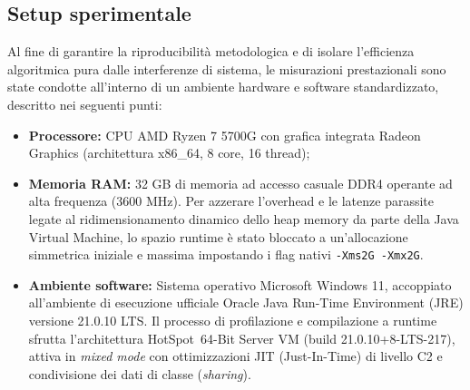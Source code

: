 \documentclass[12pt, a4paper]{article}
\begin{document}
	\subsection{Setup sperimentale}
	Al fine di garantire la riproducibilità metodologica e di isolare l'efficienza algoritmica pura dalle interferenze di sistema, le misurazioni prestazionali sono state condotte all'interno di un ambiente hardware e software standardizzato, descritto nei seguenti punti:
	\begin{itemize}
		\item \textbf{Processore:} CPU AMD Ryzen 7 5700G con grafica integrata Radeon Graphics (architettura x86\_64, 8 core, 16 thread);
		\item \textbf{Memoria RAM:} 32 GB di memoria ad accesso casuale DDR4 operante ad alta frequenza (3600 MHz). Per azzerare l'overhead e le latenze parassite legate al ridimensionamento dinamico dello heap memory da parte della Java Virtual Machine, lo spazio runtime è stato bloccato a un'allocazione simmetrica iniziale e massima impostando i flag nativi \texttt{-Xms2G -Xmx2G}.
		\item \textbf{Ambiente software:} Sistema operativo Microsoft Windows 11, accoppiato all'ambiente di esecuzione ufficiale Oracle Java Run-Time Environment (JRE) versione 21.0.10 LTS. Il processo di profilazione e compilazione a runtime sfrutta l'architettura HotSpot\texttrademark\ 64-Bit Server VM (build 21.0.10+8-LTS-217), attiva in \textit{mixed mode} con ottimizzazioni JIT (Just-In-Time) di livello C2 e condivisione dei dati di classe (\textit{sharing}).
	\end{itemize}
	
\end{document}
